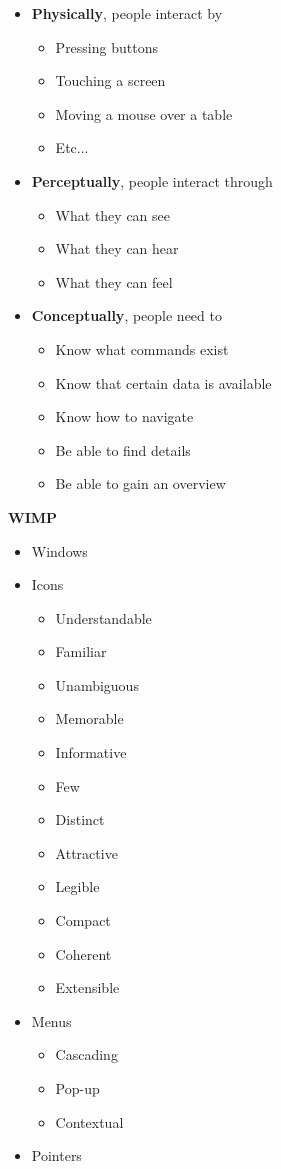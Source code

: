 \begin{itemize}
	\item \textbf{Physically}, people interact by
	\begin{itemize}
		\item Pressing buttons
		\item Touching a screen
		\item Moving a mouse over a table
		\item Etc...
	\end{itemize}
	\item \textbf{Perceptually}, people interact through
	\begin{itemize}
		\item What they can see
		\item What they can hear
		\item What they can feel
	\end{itemize}
	\item \textbf{Conceptually}, people need to
	\begin{itemize}
		\item Know what commands exist
		\item Know that certain data is available
		\item Know how to navigate
		\item Be able to find details
		\item Be able to gain an overview 
	\end{itemize}
\end{itemize}
\textbf{WIMP}\\
\begin{itemize}
	\item Windows
	\item Icons
	\begin{itemize}
		\item Understandable
		\item Familiar
		\item Unambiguous
		\item Memorable
		\item Informative
		\item Few
		\item Distinct
		\item Attractive
		\item Legible
		\item Compact
		\item Coherent
		\item Extensible
	\end{itemize}
	\item Menus
	\begin{itemize}
		\item Cascading
		\item Pop-up
		\item Contextual
	\end{itemize}
	\item Pointers
\end{itemize}
